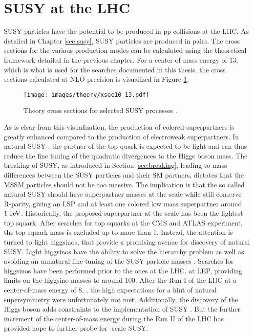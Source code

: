 \section{SUSY at the LHC}
\noindent\justify
SUSY particles have the potential to be produced in pp collisions at the LHC. 
As detailed in Chapter \ref{sec:susy}, SUSY particles are produced in pairs. 
The cross sections for the various production modes can be calculated using the theoretical framework detailed in the previous chapter. 
For a center-of-mass energy of 13\TeV, which is what is used for the searches documented in this thesis, the cross sections calculated at NLO precision is visualized in Figure \ref{fig:xsecs}. 
\begin{figure}[htbp!]
\begin{center}
    \texttt{[image: images/theory/xsec10\_13.pdf]}
    \caption{Theory cross sections for selected SUSY processes \cite{Borschensky:2014cia}.}
\label{fig:xsecs}
\end{center}
\end{figure}
As is clear from this visualization, the production of colored superpartners is greatly enhanced compared to the production of electroweak superpartners. 
In natural SUSY \cite{Dimopoulos:1995mi,Barbieri:2009ev,Papucci:2011wy}, the partner of the top quark is expected to be light and can thus reduce the fine tuning of the quadratic divergences to the Higgs boson mass.
The breaking of SUSY, as introduced in Section \ref{sec:breaking}, leading to mass differences between the SUSY particles and their SM partners, dictates that the MSSM particles should not be too massive. 
The implication is that the so called natural SUSY should have superpartner masses at the \TeV scale while still conserve R-parity, giving an LSP and at least one colored low mass superpartner around $1\,\text{Te\hspace{-.08em}V}$. 
Historically, the proposed superpartner at the \TeV scale has been the lightest top squark. 
After searches for top squarks at the CMS and ATLAS experiment, the top squark mass is excluded up to more than 1\TeV \cite{Sirunyan:2017wif}. 
Instead, the attention is turned to light higgsinos, that provide a promising avenue for discovery of natural SUSY. 
Light higgsinos have the ability to solve the hierarchy problem as well as avoiding an unnatural fine-tuning of the SUSY particle masses \cite{Han:2014kaa,Giudice:2010wb}. 
Searches for higgsinos have been performed prior to the ones at the LHC, at LEP, providing limits on the higgsino masses to around 100\GeV. 
After the Run I of the LHC at a center-of-mass energy of 8\TeV, \cite{Kraml:2012er,Autermann:2016les}, the high expectations for a hint of natural supersymmetry were unfortunately not met. 
Additionally, the discovery of the Higgs boson adds constraints to the implementation of SUSY \cite{Arbey:2011ab}. 
But the further increment of the center-of-mass energy during the Run II of the LHC has provided hope to further probe for \TeV-scale SUSY.
